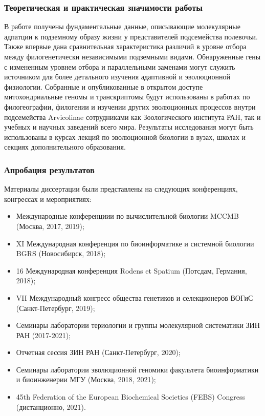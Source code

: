 \subsubsection*{Теоретическая и практическая значимости работы}
В работе получены фундаментальные данные, описывающие молекулярные адпатции к подземному образу жизни у представителей подсемейства полевочьи. Также впервые дана сравнительная характеристика различий в уровне отбора между филогенетически независимыми подземными видами. Обнаруженные гены с измененным уровнем отбора и параллельными заменами могут служить источником для более детального изучения адаптивной и эволюционной физиологии. Собранные и опубликованные в открытом доступе митохондриальные геномы и транскриптомы будут использованы в работах по филогеографии, филогении и изучении других эволюционных процессов внутри подсемейства Arvicolinae сотрудниками как Зоологического института РАН, так и учебных и научных заведений всего мира.   
Результаты исследования могут быть использованы в курсах лекций по эволюционной биологии в вузах, школах и секциях дополнительного образования.
%

\subsubsection*{Апробация результатов}

Материалы диссертации были представлены на следующих конференциях, конгрессах и мероприятиях:
\begin{itemize} 
	\item[\textbullet] Международные конференциии по вычислительной биологии MCCMB (Москва, 2017, 2019);
	\item[\textbullet] XI Международная конференция по биоинформатике и системной биологии BGRS (Новосибирск, 2018); 
	\item[\textbullet] 16 Международная конференция Rodens et Spatium (Потсдам, Германия, 2018); 
	\item[\textbullet] VII Международный конгресс общества генетиков и селекционеров ВОГиС (Санкт-Петербург, 2019);
	\item[\textbullet] Семинары лаборатории териологии и группы молекулярной систематики ЗИН РАН (2017-2021);
	\item[\textbullet] Отчетная сессия ЗИН РАН (Санкт-Петербург, 2020);
	\item[\textbullet] Семинары лаборатории эволюционной геномики факультета биоинформатики и биоинженерии МГУ (Москва, 2018, 2021);
	\item[\textbullet] 45th Federation of the European Biochemical Societies (FEBS) Congress (дистанционно, 2021).
\end{itemize}

